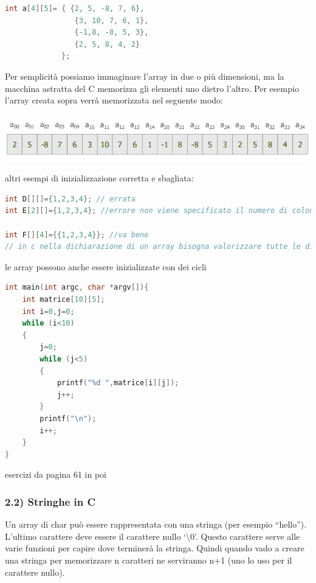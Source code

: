 \documentclass[
  paper=a4,
  oneside  ,captions=tableheading
]{scrbook}
\begin{document}
\begin{lstlisting}[language={C++}]
int a[4][5]= { {2, 5, -8, 7, 6},
                {3, 10, 7, 6, 1},
                {-1,8, -8, 5, 3},
                {2, 5, 8, 4, 2}
             };
\end{lstlisting}

Per semplicità possiamo immaginare l'array in due o più dimensioni, ma
la macchina astratta del C memorizza gli elementi uno dietro l'altro.
Per esempio l'array creata sopra verrà memorizzata nel seguente modo:

\includegraphics{./image/image-20201208150630550.png}

altri esempi di inizializzazione corretta e sbagliata:

\begin{lstlisting}[language={C++}]
int D[][]={1,2,3,4}; // errata
int E[2][]={1,2,3,4}; //errore non viene specificato il numero di colonne

int F[][4]={{1,2,3,4}}; //va bene 
// in c nella dichiarazione di un array bisogna valorizzare tutte le dimensioni, si può fare a meno di quella più a sinistra 
\end{lstlisting}

le array possono anche essere inizializzate con dei cicli

\begin{lstlisting}[language={C++}]
int main(int argc, char *argv[]){
    int matrice[10][5];
    int i=0,j=0;
    while (i<10)
    {
        j=0;
        while (j<5)
        {
            printf("%d ",matrice[i][j]);
            j++;
        }
        printf("\n");
        i++;
    }
}
\end{lstlisting}

esercizi da pagina 61 in poi

\hypertarget{stringhe-in-c}{%
\subsubsection{2.2) Stringhe in C}\label{stringhe-in-c}}

Un array di char può essere rappresentata con una stringa (per esempio
``hello''). L'ultimo carattere deve essere il carattere nullo
`\textbackslash0'. Questo carattere serve alle varie funzioni per capire
dove terminerà la stringa. Quindi quando vado a creare una stringa per
memorizzare n caratteri ne serviranno n+1 (uno lo uso per il carattere
nullo).
\end{document}
